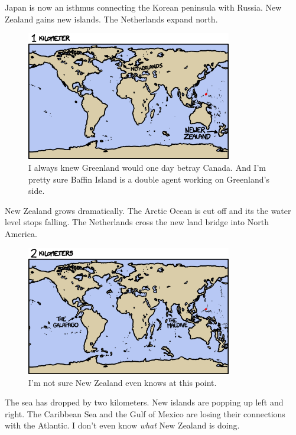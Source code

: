 {{Japan is now an isthmus connecting the Korean peninsula with Russia. New Zealand gains new islands. The Netherlands expand north.}

\begin{figure}[!htbp]
\centering
\includegraphics[scale=0.5, max width=0.8\textwidth]{imgs/a/53/drain_1km.png}
\caption{I always knew Greenland would one day betray Canada. And I'm pretty sure Baffin Island is a double agent working on Greenland's side.}
\end{figure}

{New Zealand grows dramatically. The Arctic Ocean is cut off and its the water level stops falling. The Netherlands cross the new land bridge into North America.}

\begin{figure}[!htbp]
\centering
\includegraphics[scale=0.5, max width=0.8\textwidth]{imgs/a/53/drain_2km.png}
\caption{I'm not sure New Zealand even knows at this point.}
\end{figure}

{The sea has dropped by two kilometers. New islands are popping up left and right. The Caribbean Sea and the Gulf of Mexico are losing their connections with the Atlantic. I don't even know \emph{what} New Zealand is doing.}

}
